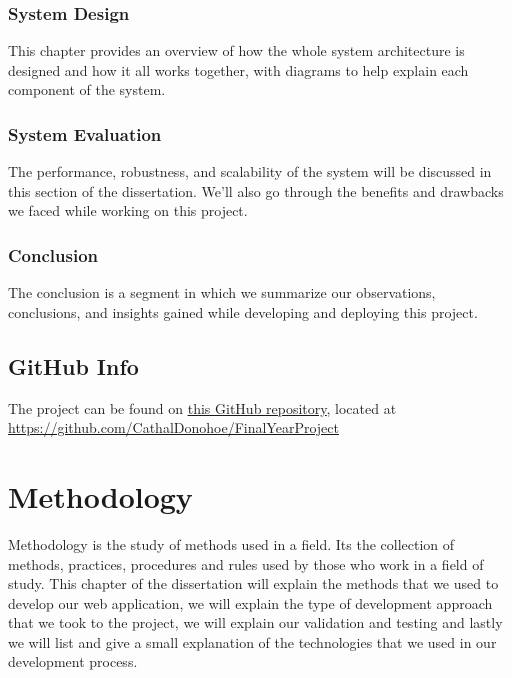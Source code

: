 \subsection{System Design}
This chapter provides an overview of how the whole system architecture is designed and how it all works together, with diagrams to help explain each component of the system. 

\subsection{System Evaluation}
The performance, robustness, and scalability of the system will be discussed in this section of the dissertation. We'll also go through the benefits and drawbacks we faced while working on this project. 

\subsection{Conclusion}
The conclusion is a segment in which we summarize our observations, conclusions, and insights gained while developing and deploying this project. 

\section{GitHub Info}
The project can be found on \underline{\href{https://github.com/CathalDonohoe/FinalYearProject}{this GitHub repository}}, located at \url{https://github.com/CathalDonohoe/FinalYearProject}

\chapter{Methodology}
Methodology is the study of methods used in a field. Its the collection of methods, practices, procedures and rules used by those who work in a field of study. This chapter of the dissertation will explain the methods that we used to develop our web application, we will explain the type of development approach that we took to the project, we will explain our validation and testing and lastly we will list and give a small explanation of the technologies that we used in our development process.

